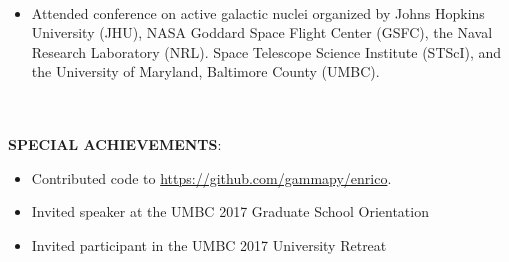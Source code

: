 \documentclass{article}
\begin{document}
\phantom \\
\begin{itemize}
\item Attended conference on active galactic nuclei organized by Johns Hopkins University (JHU),  NASA Goddard Space Flight Center (GSFC), the Naval Research Laboratory (NRL). Space Telescope Science Institute (STScI), and the University of Maryland, Baltimore County (UMBC).
\end{itemize}
\phantom \\
\phantom \\
%
%
%
%
\noindent \textbf{SPECIAL ACHIEVEMENTS}:
\begin{itemize}
\item Contributed code to \hyperref[enrico]{https://github.com/gammapy/enrico}.
\item Invited speaker at the UMBC 2017 Graduate School Orientation
\item Invited participant in the UMBC 2017 University Retreat
\end{itemize}
\phantom \\
%
%
%
%
%
%
\end{document}
